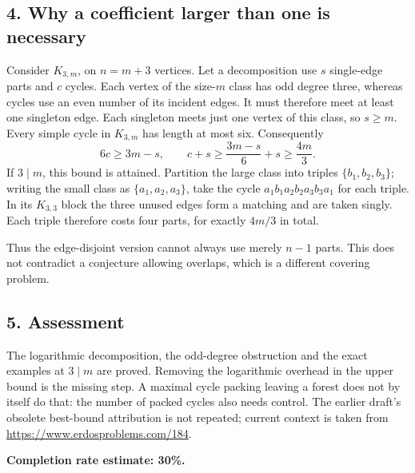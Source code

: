 \subsection*{4. Why a coefficient larger than one is necessary}
Consider $K_{3,m}$, on $n=m+3$ vertices. Let a decomposition use $s$ single-edge parts and $c$ cycles. Each vertex of the size-$m$ class has odd degree three, whereas cycles use an even number of its incident edges. It must therefore meet at least one singleton edge. Each singleton meets just one vertex of this class, so $s\ge m$.
Every simple cycle in $K_{3,m}$ has length at most six. Consequently
\[
 6c\ge3m-s,\qquad
 c+s\ge\frac{3m-s}{6}+s\ge\frac{4m}{3}.\tag{3}
\]
If $3\mid m$, this bound is attained. Partition the large class into triples $\{b_1,b_2,b_3\}$; writing the small class as $\{a_1,a_2,a_3\}$, take the cycle
$a_1b_1a_2b_2a_3b_3a_1$ for each triple. In its $K_{3,3}$ block the three unused edges form a matching and are taken singly. Each triple therefore costs four parts, for exactly $4m/3$ in total.

Thus the edge-disjoint version cannot always use merely $n-1$ parts. This does not contradict a conjecture allowing overlaps, which is a different covering problem.

\subsection*{5. Assessment}
The logarithmic decomposition, the odd-degree obstruction and the exact examples at $3\mid m$ are proved. Removing the logarithmic overhead in the upper bound is the missing step. A maximal cycle packing leaving a forest does not by itself do that: the number of packed cycles also needs control. The earlier draft's obsolete best-bound attribution is not repeated; current context is taken from \url{https://www.erdosproblems.com/184}.

\textbf{Completion rate estimate: 30\%.}

